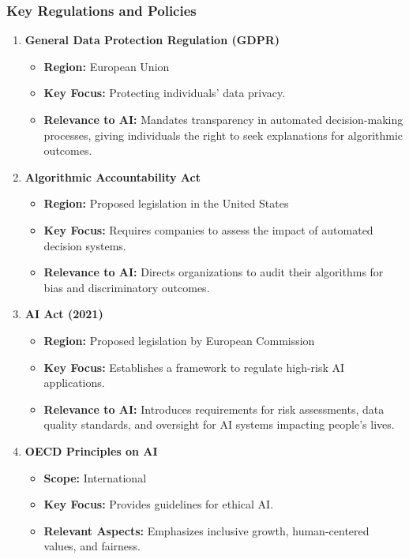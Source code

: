 \documentclass{beamer}
\begin{document}
\begin{frame}[fragile]
    \frametitle{Key Regulations and Policies}
    \begin{enumerate}
        \item \textbf{General Data Protection Regulation (GDPR)}
        \begin{itemize}
            \item \textbf{Region:} European Union
            \item \textbf{Key Focus:} Protecting individuals' data privacy.
            \item \textbf{Relevance to AI:} Mandates transparency in automated decision-making processes, giving individuals the right to seek explanations for algorithmic outcomes.
        \end{itemize}
        
        \item \textbf{Algorithmic Accountability Act}
        \begin{itemize}
            \item \textbf{Region:} Proposed legislation in the United States
            \item \textbf{Key Focus:} Requires companies to assess the impact of automated decision systems.
            \item \textbf{Relevance to AI:} Directs organizations to audit their algorithms for bias and discriminatory outcomes.
        \end{itemize}
        
        \item \textbf{AI Act (2021)}
        \begin{itemize}
            \item \textbf{Region:} Proposed legislation by European Commission
            \item \textbf{Key Focus:} Establishes a framework to regulate high-risk AI applications.
            \item \textbf{Relevance to AI:} Introduces requirements for risk assessments, data quality standards, and oversight for AI systems impacting people's lives.
        \end{itemize}
        
        \item \textbf{OECD Principles on AI}
        \begin{itemize}
            \item \textbf{Scope:} International
            \item \textbf{Key Focus:} Provides guidelines for ethical AI.
            \item \textbf{Relevant Aspects:} Emphasizes inclusive growth, human-centered values, and fairness.
        \end{itemize}
    \end{enumerate}
\end{frame}
\end{document}

